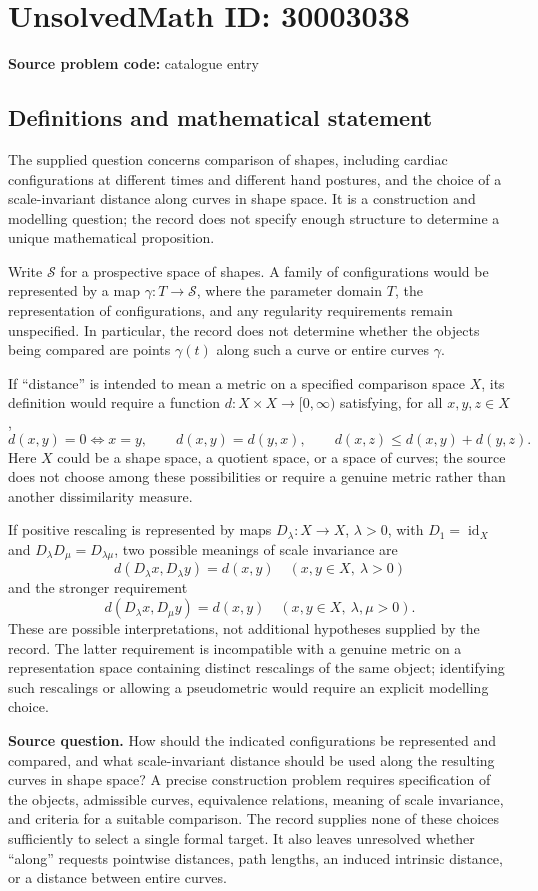 \documentclass[11pt]{article}
\begin{document}
\section*{UnsolvedMath ID: 30003038}
\textbf{Source problem code:} catalogue entry
\subsection{Definitions and mathematical statement}
The supplied question concerns comparison of shapes, including cardiac configurations at different times and different hand postures, and the choice of a scale-invariant distance along curves in shape space. It is a construction and modelling question; the record does not specify enough structure to determine a unique mathematical proposition.

Write \(\mathcal S\) for a prospective space of shapes. A family of configurations would be represented by a map \(\gamma:T\to\mathcal S\), where the parameter domain \(T\), the representation of configurations, and any regularity requirements remain unspecified. In particular, the record does not determine whether the objects being compared are points \(\gamma(t)\) along such a curve or entire curves \(\gamma\).

If ``distance'' is intended to mean a metric on a specified comparison space \(X\), its definition would require a function \(d:X\times X\to[0,\infty)\) satisfying, for all \(x,y,z\in X\),
\[
 d(x,y)=0\iff x=y,\qquad d(x,y)=d(y,x),\qquad d(x,z)\leq d(x,y)+d(y,z).
\]
Here \(X\) could be a shape space, a quotient space, or a space of curves; the source does not choose among these possibilities or require a genuine metric rather than another dissimilarity measure.

If positive rescaling is represented by maps \(D_\lambda:X\to X\), \(\lambda>0\), with \(D_1=\operatorname{id}_X\) and \(D_\lambda D_\mu=D_{\lambda\mu}\), two possible meanings of scale invariance are
\[
 d(D_\lambda x,D_\lambda y)=d(x,y)
 \quad(x,y\in X,\ \lambda>0)
\]
and the stronger requirement
\[
 d(D_\lambda x,D_\mu y)=d(x,y)
 \quad(x,y\in X,\ \lambda,\mu>0).
\]
These are possible interpretations, not additional hypotheses supplied by the record. The latter requirement is incompatible with a genuine metric on a representation space containing distinct rescalings of the same object; identifying such rescalings or allowing a pseudometric would require an explicit modelling choice.

\textbf{Source question.} How should the indicated configurations be represented and compared, and what scale-invariant distance should be used along the resulting curves in shape space? A precise construction problem requires specification of the objects, admissible curves, equivalence relations, meaning of scale invariance, and criteria for a suitable comparison. The record supplies none of these choices sufficiently to select a single formal target. It also leaves unresolved whether ``along'' requests pointwise distances, path lengths, an induced intrinsic distance, or a distance between entire curves.
\end{document}
